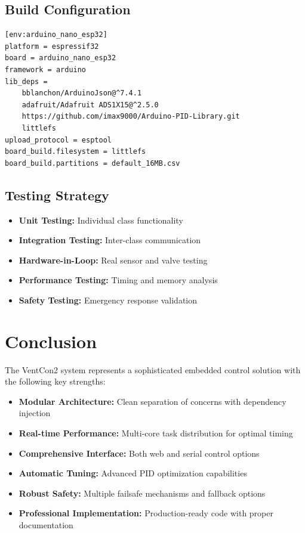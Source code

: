\documentclass[12pt,a4paper]{article}
\begin{document}
\subsection{Build Configuration}
\begin{lstlisting}[caption=PlatformIO Configuration]
[env:arduino_nano_esp32]
platform = espressif32
board = arduino_nano_esp32
framework = arduino
lib_deps = 
    bblanchon/ArduinoJson@^7.4.1
    adafruit/Adafruit ADS1X15@^2.5.0
    https://github.com/imax9000/Arduino-PID-Library.git
    littlefs
upload_protocol = esptool
board_build.filesystem = littlefs
board_build.partitions = default_16MB.csv
\end{lstlisting}

\subsection{Testing Strategy}
\begin{itemize}
    \item \textbf{Unit Testing:} Individual class functionality
    \item \textbf{Integration Testing:} Inter-class communication
    \item \textbf{Hardware-in-Loop:} Real sensor and valve testing
    \item \textbf{Performance Testing:} Timing and memory analysis
    \item \textbf{Safety Testing:} Emergency response validation
\end{itemize}

\section{Conclusion}

The VentCon2 system represents a sophisticated embedded control solution with the following key strengths:

\begin{itemize}
    \item \textbf{Modular Architecture:} Clean separation of concerns with dependency injection
    \item \textbf{Real-time Performance:} Multi-core task distribution for optimal timing
    \item \textbf{Comprehensive Interface:} Both web and serial control options
    \item \textbf{Automatic Tuning:} Advanced PID optimization capabilities
    \item \textbf{Robust Safety:} Multiple failsafe mechanisms and fallback options
    \item \textbf{Professional Implementation:} Production-ready code with proper documentation
\end{itemize}
\end{document}
